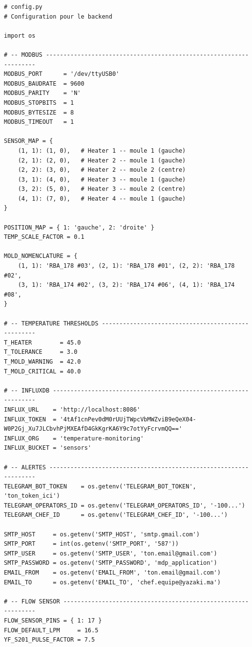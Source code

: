 \begin{lstlisting}
# config.py
# Configuration pour le backend

import os

# -- MODBUS -------------------------------------------------------------------
MODBUS_PORT      = '/dev/ttyUSB0'
MODBUS_BAUDRATE  = 9600
MODBUS_PARITY    = 'N'
MODBUS_STOPBITS  = 1
MODBUS_BYTESIZE  = 8
MODBUS_TIMEOUT   = 1

SENSOR_MAP = {
    (1, 1): (1, 0),   # Heater 1 -- moule 1 (gauche)
    (2, 1): (2, 0),   # Heater 2 -- moule 1 (gauche)
    (2, 2): (3, 0),   # Heater 2 -- moule 2 (centre)
    (3, 1): (4, 0),   # Heater 3 -- moule 1 (gauche)
    (3, 2): (5, 0),   # Heater 3 -- moule 2 (centre)
    (4, 1): (7, 0),   # Heater 4 -- moule 1 (gauche)
}

POSITION_MAP = { 1: 'gauche', 2: 'droite' }
TEMP_SCALE_FACTOR = 0.1

MOLD_NOMENCLATURE = {
    (1, 1): 'RBA_178 #03', (2, 1): 'RBA_178 #01', (2, 2): 'RBA_178 #02',
    (3, 1): 'RBA_174 #02', (3, 2): 'RBA_174 #06', (4, 1): 'RBA_174 #08',
}

# -- TEMPERATURE THRESHOLDS ---------------------------------------------------
T_HEATER        = 45.0
T_TOLERANCE     = 3.0
T_MOLD_WARNING  = 42.0
T_MOLD_CRITICAL = 40.0

# -- INFLUXDB -----------------------------------------------------------------
INFLUX_URL    = 'http://localhost:8086'
INFLUX_TOKEN  = '4tAf1cnPev0dM0rUUjTWpcVbMWZviB9eQeX04-W0P2Gj_Xu7JLCbvhPjMXEAfD4GkKgrKA6Y9c7otYyFcrvmQQ=='
INFLUX_ORG    = 'temperature-monitoring'
INFLUX_BUCKET = 'sensors'

# -- ALERTES ------------------------------------------------------------------
TELEGRAM_BOT_TOKEN    = os.getenv('TELEGRAM_BOT_TOKEN', 'ton_token_ici')
TELEGRAM_OPERATORS_ID = os.getenv('TELEGRAM_OPERATORS_ID', '-100...')
TELEGRAM_CHEF_ID      = os.getenv('TELEGRAM_CHEF_ID', '-100...')

SMTP_HOST     = os.getenv('SMTP_HOST', 'smtp.gmail.com')
SMTP_PORT     = int(os.getenv('SMTP_PORT', '587'))
SMTP_USER     = os.getenv('SMTP_USER', 'ton.email@gmail.com')
SMTP_PASSWORD = os.getenv('SMTP_PASSWORD', 'mdp_application')
EMAIL_FROM    = os.getenv('EMAIL_FROM', 'ton.email@gmail.com')
EMAIL_TO      = os.getenv('EMAIL_TO', 'chef.equipe@yazaki.ma')

# -- FLOW SENSOR --------------------------------------------------------------
FLOW_SENSOR_PINS = { 1: 17 }
FLOW_DEFAULT_LPM     = 16.5
YF_S201_PULSE_FACTOR = 7.5


\end{lstlisting}
